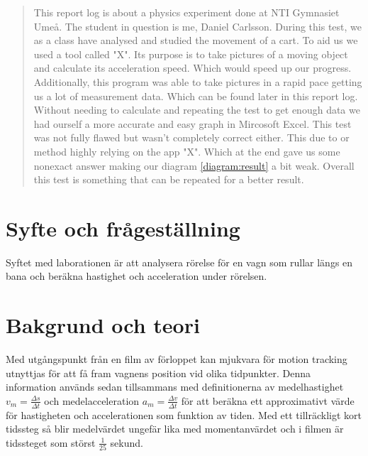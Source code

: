 \documentclass[11p, titlepage, oneside, a4paper]{article}
\begin{document}
    \begin{otherlanguage}{english}
	\begin{abstract}
        This report log is about a physics experiment done at NTI Gymnasiet Umeå. The student in question is me, Daniel Carlsson. During this test, we as a class have analysed and studied the movement of a cart. To aid us we used a tool called "X". Its purpose is to take pictures of a moving object and calculate its acceleration speed. Which would speed up our progress. Additionally, this program was able to take pictures in a rapid pace getting us a lot of measurement data. Which can be found later in this report log. Without needing to calculate and repeating the test to get enough data we had ourself a more accurate and easy graph in Mircosoft Excel. This test was not fully flawed but wasn't completely correct either. This due to or method highly relying on the app "X". Which at the end gave us some nonexact answer making our diagram \ref{diagram:result} a bit weak. Overall this test is something that can be repeated for a better result.
    \end{abstract}
    \end{otherlanguage}
	\tableofcontents
	
	\newpage

	
	\setlength{\parindent}{0pt}
	\setlength{\parskip}{10pt}
	
	\section{Syfte och frågeställning}
		Syftet med laborationen är att analysera rörelse för en vagn som rullar längs en bana och beräkna hastighet och acceleration under rörelsen.

	\section{Bakgrund och teori}
        Med utgångspunkt från en film av förloppet kan mjukvara för motion tracking utnyttjas för att få fram vagnens position vid olika tidpunkter. Denna information används sedan tillsammans med definitionerna av medelhastighet $v_m = \frac{\Delta s}{\Delta t}$ och medelacceleration $a_m = \frac{\Delta v}{\Delta t}$ för att beräkna ett approximativt värde för hastigheten och accelerationen som funktion av tiden. Med ett tillräckligt kort tidssteg så blir medelvärdet ungefär lika med momentanvärdet och i filmen är tidssteget som störst $\frac{1}{25}$ sekund.  \parencite{impuls}
	
\end{document}
